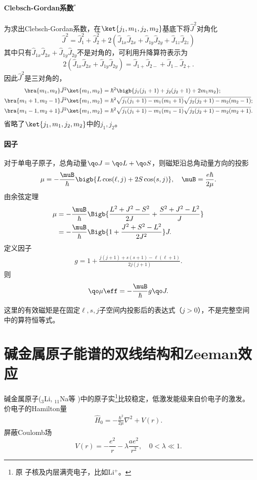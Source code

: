 \paragraph{Clebsch-Gordan系数$^\ast$}为求出Clebsch-Gordan系数，在$\ket{j_1,m_1,j_2,m_2}$基底下将$\hat J^2$对角化
\[
	\hat J^2=\hat J_1^2+\hat J_2^2+2(\hat J_{1x}\hat J_{2x}+\hat J_{1y}\hat J_{2y}+\hat J_{1z}\hat J_{2z})
\]
其中只有$\hat J_{1x}\hat J_{2x}+\hat J_{1y}\hat J_{2y}$不是对角的，可利用升降算符表示为
\[
2(\hat J_{1x}\hat J_{2x}+\hat J_{1y}\hat J_{2y})=\hat J_{1+}\hat J_{2-}+\hat J_{1-}\hat J_{2+}.
\]
因此$\hat J^2$是三对角的，
{\footnotesize
\begin{align*}
	\bra{m_1,m_2}\hat J^2\ket{m_1,m_2}&=\hbar^2\bigb{j_1(j_1+1)+j_2(j_2+1)+2m_1m_2};\\
	\bra{m_1+1,m_2-1}\hat J^2\ket{m_1,m_2}&=\hbar^2\sqrt{j_1(j_1+1)-m_1(m_1+1)}\sqrt{j_2(j_2+1)-m_2(m_2-1)};\\
	\bra{m_1-1,m_2+1}\hat J^2\ket{m_1,m_2}&=\hbar^2\sqrt{j_1(j_1+1)-m_1(m_1-1)}\sqrt{j_2(j_2+1)-m_2(m_2+1)}.
\end{align*}
}
省略了$\ket{j_1,m_1,j_2,m_2}$中的$j_1,j_2$。
\paragraph{\Lande 因子}对于单电子原子，总角动量$\qo J=\qo L+\qo S$，则磁矩沿总角动量方向的投影
\[
	\mu=-\frac\muB\hbar\bigb{L\cos(\ell,j)+2S\cos(s,j)},\quad\muB=\frac{e\hbar}{2\mu}.
\]
由余弦定理
\begin{align*}
	\mu&=-\frac\muB\hbar\Bigb{\frac{L^2+J^2-S^2}{2J}+\frac{S^2+J^2-L^2}J}\\
	&=-\frac\muB\hbar\Bigb{1+\frac{J^2+S^2-L^2}{2J^2}}J.
\end{align*}
定义\Lande 因子 
\begin{align}
	g=1+\frac{j(j+1)+s(s+1)-\ell(\ell+1)}{2j(j+1)}.
\end{align}
则
\[
	\qo\mu\eff=-\frac\muB\hbar g\qo J.
\]

这里的有效磁矩是在固定$\ell,s,j$子空间内投影后的表达式（$j>0$），不是完整空间中的算符恒等式。

\section{碱金属原子能谱的双线结构和Zeeman效应}
碱金属原子($_3$Li, $_{11}$Na等%
)中的原子实\footnote{原
子核及内层满壳电子，比如Li$^+$。}比较稳定，低激发能级来自价电子的激发。价电子的Hamilton量
\begin{align}
	\hat H_0=-\frac{\hbar^2}{2\mu}\nabla^2+V(r).
\end{align}
屏蔽Coulomb场
\[
V(r)=-\frac{e^2}r-\lambda\frac{ae^2}{r^2},\quad 0<\lambda\ll 1.
\]

